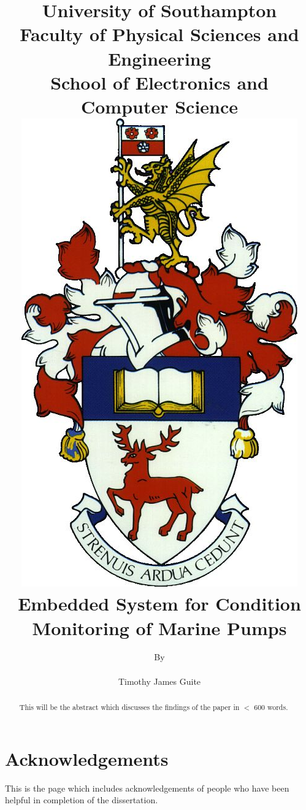 \documentclass[12pt]{report}
\title{\vspace{-10ex}
	{\small University of Southampton}\\
	{\small Faculty of Physical Sciences and Engineering}\\
	{\small School of Electronics and Computer Science}\\
	[2cm]
	{\includegraphics{Images/coat_of_arms.jpg}}\\[2cm]
	\textbf{{Embedded System for Condition Monitoring of Marine Pumps}}
}
\author{By\\ \\
	Timothy James Guite}
\date{\parbox{\linewidth}{\centering%
  \today\endgraf\bigskip
  Supervisor: Dr Alex Weddell\\
Second Examiner:\endgraf\bigskip
A dissertation submitted in partial fulfillment of the degree of \\
\textbf{MSc Embedded Systems}}}
\begin{document}
\maketitle

\begin{abstract}

This will be the abstract which discusses the findings of the paper in $<$ 600 words.

\end{abstract}

\chapter*{Acknowledgements}
This is the page which includes acknowledgements of people who have been helpful in completion of the dissertation.

\tableofcontents

\listoffigures


\end{document}
